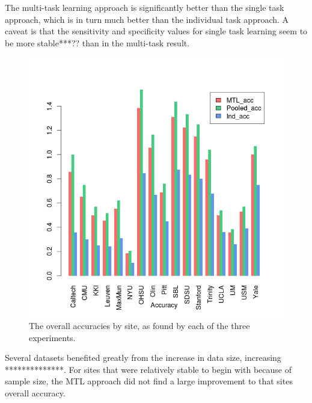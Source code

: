\documentclass{llncs}
\begin{document}
The multi-task learning approach is significantly better than the single task approach, which is in turn much better than the individual task approach. A caveat is that the sensitivity and specificity values for single task learning seem to be more stable***?? than in the multi-task result.
\begin{figure}
	\centering
	\includegraphics[scale = .6]{acc_bar.png}
	\caption{The overall accuracies by site, as found by each of the three experiments. }
	\label{fig:acc_bar}
\end{figure}


Several datasets benefited greatly from the increase in data size, increasing **************.  For sites that were relatively stable to begin with because of sample size, the MTL approach did not find a large improvement to that sites overall accuracy.
\end{document}
